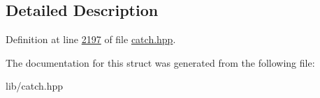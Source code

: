 \subsection{Detailed Description}


Definition at line \mbox{\hyperlink{catch_8hpp_source_l02197}{2197}} of file \mbox{\hyperlink{catch_8hpp_source}{catch.\+hpp}}.



The documentation for this struct was generated from the following file\+:\begin{DoxyCompactItemize}
\item 
lib/catch.\+hpp\end{DoxyCompactItemize}
